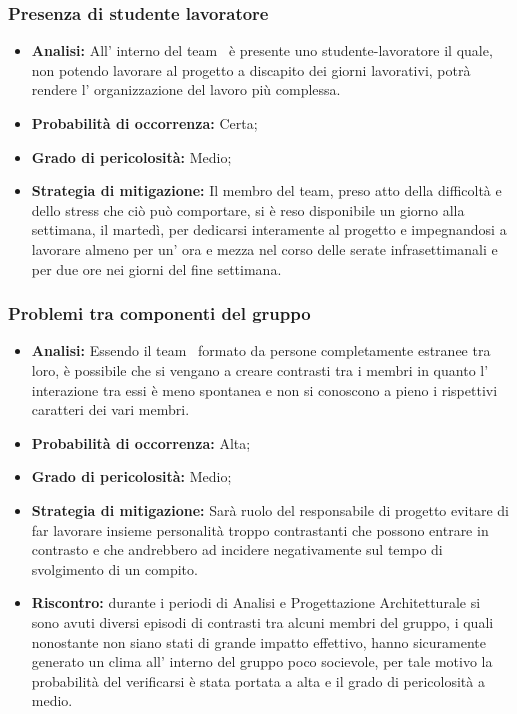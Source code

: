 \subsubsection{Presenza di studente lavoratore}
	\begin{itemize}
	\item \textbf{Analisi: }All' interno del team \gruppo ~è presente uno studente-lavoratore il quale, non potendo lavorare al progetto a discapito dei giorni lavorativi, potrà rendere l' organizzazione del lavoro più complessa.
	\item \textbf{Probabilità di occorrenza:} Certa;
	\item \textbf{Grado di pericolosità:} Medio;
	\item \textbf{Strategia di mitigazione: }Il membro del team, preso atto della difficoltà e dello stress che ciò può comportare, si è reso disponibile un giorno alla settimana, il martedì, per dedicarsi interamente al progetto e impegnandosi a lavorare almeno per un' ora e mezza nel corso delle serate infrasettimanali e per due ore nei giorni del fine settimana.	
	\end{itemize}
\subsubsection{Problemi tra componenti del gruppo}
	\begin{itemize}
	\item \textbf{Analisi: }Essendo il team \gruppo ~formato da persone completamente estranee tra loro, è possibile che si vengano a creare contrasti tra i membri in quanto l' interazione tra essi è meno spontanea e non si conoscono a pieno i rispettivi caratteri dei vari membri.
	\item \textbf{Probabilità di occorrenza:} Alta;
	\item \textbf{Grado di pericolosità:} Medio;
	\item \textbf{Strategia di mitigazione: }Sarà ruolo del responsabile di progetto evitare di far lavorare insieme personalità troppo contrastanti che possono entrare in contrasto e che andrebbero ad incidere negativamente sul tempo di svolgimento di un compito.
	\item \textbf{Riscontro:} durante i periodi di Analisi e Progettazione Architetturale si sono avuti diversi episodi di contrasti tra alcuni membri del gruppo, i quali nonostante non siano stati di grande impatto effettivo, hanno sicuramente generato un clima all' interno del gruppo poco socievole, per tale motivo la probabilità del verificarsi è stata portata a alta e il grado di pericolosità a medio.
	\end{itemize}

